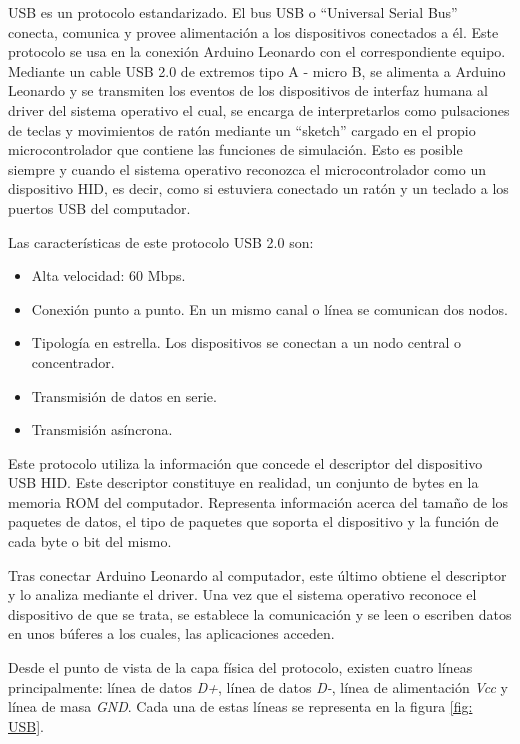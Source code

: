 USB es un protocolo estandarizado. El bus USB o ``Universal Serial Bus'' conecta, comunica y provee alimentación a los dispositivos conectados a él. Este protocolo se usa en la conexión Arduino Leonardo con el correspondiente equipo. Mediante un cable USB 2.0 de extremos tipo A - micro B, se alimenta a Arduino Leonardo y se transmiten los eventos de los dispositivos de interfaz humana al driver del sistema operativo el cual, se encarga de interpretarlos como pulsaciones de teclas y movimientos de ratón mediante un ``sketch'' cargado en el propio microcontrolador que contiene las funciones de simulación. Esto es posible siempre y cuando el sistema operativo reconozca el microcontrolador como un dispositivo HID, es decir, como si estuviera conectado un ratón y un teclado a los puertos USB del computador.

Las características de este protocolo USB 2.0 son:
\begin{itemize}
    \item Alta velocidad: 60 Mbps.
    \item Conexión punto a punto. En un mismo canal o línea se comunican dos nodos. 
    \item Tipología en estrella. Los dispositivos se conectan a un nodo central o concentrador.
    \item Transmisión de datos en serie.
    \item Transmisión asíncrona.
\end{itemize}

Este protocolo utiliza la información que concede el descriptor del dispositivo USB HID. Este descriptor constituye en realidad, un conjunto de bytes en la memoria ROM del computador. Representa información acerca del tamaño de los paquetes de datos, el tipo de paquetes que soporta el dispositivo y la función de cada byte o bit del mismo. 

Tras conectar Arduino Leonardo al computador, este último obtiene el descriptor y lo analiza mediante el driver. Una vez que el sistema operativo reconoce el dispositivo de que se trata, se establece la comunicación y se leen o escriben datos en unos búferes a los cuales, las aplicaciones acceden.

Desde el punto de vista de la capa física del protocolo, existen cuatro líneas principalmente: línea de datos {\itshape D+}, línea de datos {\itshape D-}, línea de alimentación {\itshape Vcc} y línea de masa {\itshape GND}. Cada una de estas líneas se representa en la figura \ref{fig: USB}.

